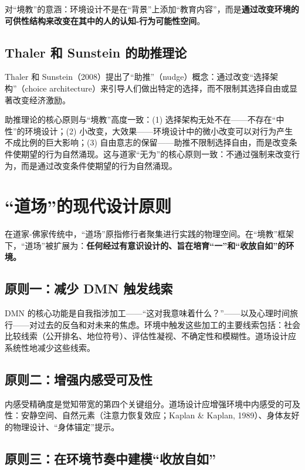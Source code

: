 \documentclass[UTF8,12pt,a4paper]{ctexart}
\begin{document}
对``境教''的意涵：环境设计不是在``背景''上添加``教育内容''，而是\textbf{通过改变环境的可供性结构来改变在其中的人的认知-行为可能性空间}。

\subsection{Thaler 和 Sunstein 的助推理论}

Thaler 和 Sunstein（2008）提出了``助推''（nudge）概念：通过改变``选择架构''（choice architecture）来引导人们做出特定的选择，而不限制其选择自由或显著改变经济激励。

助推理论的核心原则与``境教''高度一致：(1) 选择架构无处不在——不存在``中性''的环境设计；(2) 小改变，大效果——环境设计中的微小改变可以对行为产生不成比例的巨大影响；(3) 自由意志的保留——助推不限制选择自由，而是改变条件使期望的行为自然涌现。这与道家``无为''的核心原则一致：不通过强制来改变行为，而是通过改变条件使期望的行为自然涌现。

\section{``道场''的现代设计原则}

在道家-佛家传统中，``道场''原指修行者聚集进行实践的物理空间。在``境教''框架下，``道场''被扩展为：\textbf{任何经过有意识设计的、旨在培育``一''和``收放自如''的环境。}

\subsection{原则一：减少 DMN 触发线索}

DMN 的核心功能是自我指涉加工——``这对我意味着什么？''——以及心理时间旅行——对过去的反刍和对未来的焦虑。环境中触发这些加工的主要线索包括：社会比较线索（公开排名、地位符号）、评估性凝视、不确定性和模糊性。道场设计应系统性地减少这些线索。

\subsection{原则二：增强内感受可及性}

内感受精确度是觉知带宽的第四个关键组分。道场设计应增强环境中内感受的可及性：安静空间、自然元素（注意力恢复效应；Kaplan \& Kaplan, 1989）、身体友好的物理设计、``身体锚定''提示。

\subsection{原则三：在环境节奏中建模``收放自如''}
\end{document}
